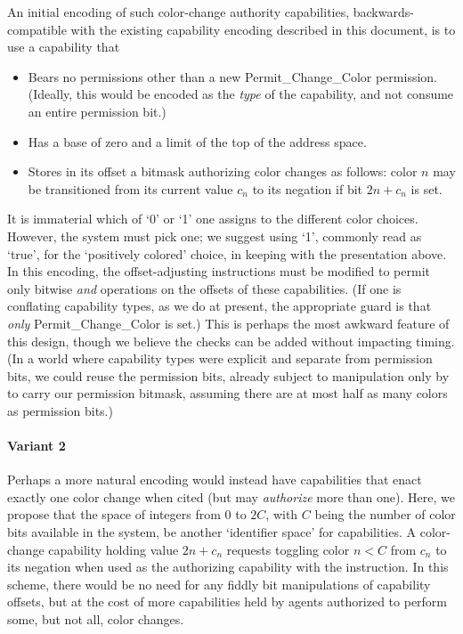 An initial encoding of such color-change authority capabilities,
backwards-compatible with the existing capability encoding described in this
document, is to use a capability that
%
\begin{itemize}
%
  \item Bears no permissions other than a new Permit\_Change\_Color permission.
(Ideally, this would be encoded as the \emph{type} of the capability, and not
consume an entire permission bit.)
%
  \item Has a base of zero and a limit of the top of the address space.
%
  \item Stores in its offset a bitmask authorizing color changes as follows:
color $n$ may be transitioned from its current value $c_n$ to its negation
if bit $2n + c_n$ is set.
%
\end{itemize}
%
It is immaterial which of `0' or `1' one assigns to the different color
choices.  However, the system must pick one; we suggest using `1',
commonly read as `true', for the `positively colored' choice, in keeping with the
presentation above.
In this encoding, the offset-adjusting instructions must be modified to
permit only bitwise \emph{and} operations on the offsets of these capabilities.
(If one is conflating capability types, as we do at present, the appropriate
guard is that \emph{only} Permit\_Change\_Color is set.) This is perhaps the
most awkward feature of this design, though we believe the checks can be
added without impacting timing.  (In a world where capability types were
explicit and separate from permission bits, we could reuse the permission
bits, already subject to manipulation only by  to
carry our permission bitmask, assuming there are at most half as many colors
as permission bits.)

\paragraph{Variant 2}
%
Perhaps a more natural encoding
would instead have capabilities that enact
exactly one color change when cited (but may \emph{authorize} more than one).
Here, we propose that the space of integers from $0$ to $2C$, with $C$ being
the number of color bits available in the system, be another `identifier
space' for capabilities.  A color-change capability holding value $2n+c_n$
requests toggling color $n < C$ from $c_n$ to its negation when used as the
authorizing capability with the  instruction.  In
this scheme, there would be no need for any fiddly bit manipulations of
capability offsets, but at the cost of more capabilities held by agents
authorized to perform some, but not all, color changes.

